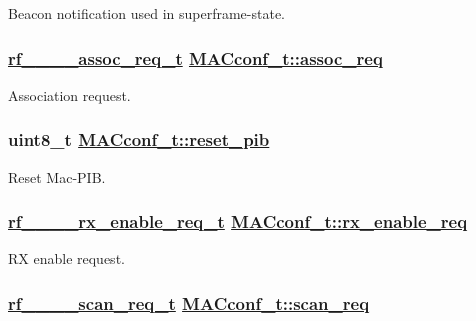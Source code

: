Beacon notification used in superframe-state. \hypertarget{structMACconf__t_e47a1dd387bee08f7bacc39767ab40fb}{
\subsubsection[assoc\_\-req]{\setlength{\rightskip}{0pt plus 5cm}\hyperlink{structrf__802__15__4__assoc__req__t}{rf\_\_\_\_\-assoc\_\-req\_\-t} \hyperlink{structMACconf__t_e47a1dd387bee08f7bacc39767ab40fb}{MACconf\_\-t::assoc\_\-req}}}
\label{structMACconf__t_e47a1dd387bee08f7bacc39767ab40fb}


Association request. \hypertarget{structMACconf__t_2b7fa48ad7fcf57826a84788de348506}{
\subsubsection[reset\_\-pib]{\setlength{\rightskip}{0pt plus 5cm}uint8\_\-t \hyperlink{structMACconf__t_2b7fa48ad7fcf57826a84788de348506}{MACconf\_\-t::reset\_\-pib}}}
\label{structMACconf__t_2b7fa48ad7fcf57826a84788de348506}


Reset Mac-PIB. \hypertarget{structMACconf__t_605ed174a898d40031b09106bb52652b}{
\subsubsection[rx\_\-enable\_\-req]{\setlength{\rightskip}{0pt plus 5cm}\hyperlink{structrf__802__15__4__rx__enable__req__t}{rf\_\_\_\_\-rx\_\-enable\_\-req\_\-t} \hyperlink{structMACconf__t_605ed174a898d40031b09106bb52652b}{MACconf\_\-t::rx\_\-enable\_\-req}}}
\label{structMACconf__t_605ed174a898d40031b09106bb52652b}


RX enable request. \hypertarget{structMACconf__t_73ddbc4883498f43868b76256fabc951}{
\subsubsection[scan\_\-req]{\setlength{\rightskip}{0pt plus 5cm}\hyperlink{structrf__802__15__4__scan__req__t}{rf\_\_\_\_\-scan\_\-req\_\-t} \hyperlink{structMACconf__t_73ddbc4883498f43868b76256fabc951}{MACconf\_\-t::scan\_\-req}}}
\label{structMACconf__t_73ddbc4883498f43868b76256fabc951}


